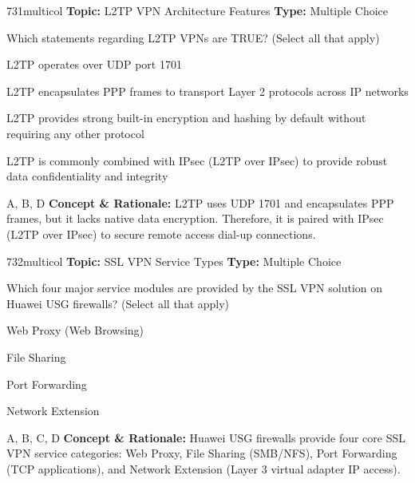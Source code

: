 \begin{qcard}{731}{multicol}
\textcolor{darkslate!75}{\small\textbf{Topic:} L2TP VPN Architecture Features \hfill \textbf{Type:} Multiple Choice}\vspace{0.4em}\par
Which statements regarding L2TP VPNs are TRUE? (Select all that apply)
\begin{qoptions}
\item L2TP operates over UDP port 1701
\item L2TP encapsulates PPP frames to transport Layer 2 protocols across IP networks
\item L2TP provides strong built-in encryption and hashing by default without requiring any other protocol
\item L2TP is commonly combined with IPsec (L2TP over IPsec) to provide robust data confidentiality and integrity
\end{qoptions}
\end{qcard}
\nopagebreak
\begin{explainbox}{A, B, D}
\textbf{Concept \& Rationale:} L2TP uses UDP 1701 and encapsulates PPP frames, but it lacks native data encryption. Therefore, it is paired with IPsec (L2TP over IPsec) to secure remote access dial-up connections.
\end{explainbox}

\begin{qcard}{732}{multicol}
\textcolor{darkslate!75}{\small\textbf{Topic:} SSL VPN Service Types \hfill \textbf{Type:} Multiple Choice}\vspace{0.4em}\par
Which four major service modules are provided by the SSL VPN solution on Huawei USG firewalls? (Select all that apply)
\begin{qoptions}
\item Web Proxy (Web Browsing)
\item File Sharing
\item Port Forwarding
\item Network Extension
\end{qoptions}
\end{qcard}
\nopagebreak
\begin{explainbox}{A, B, C, D}
\textbf{Concept \& Rationale:} Huawei USG firewalls provide four core SSL VPN service categories: Web Proxy, File Sharing (SMB/NFS), Port Forwarding (TCP applications), and Network Extension (Layer 3 virtual adapter IP access).
\end{explainbox}

